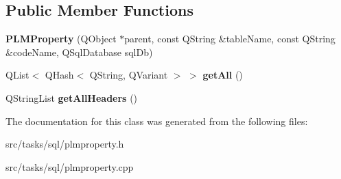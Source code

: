 \subsection*{Public Member Functions}
\begin{DoxyCompactItemize}
\item 
{\bfseries P\+L\+M\+Property} (Q\+Object $\ast$parent, const Q\+String \&table\+Name, const Q\+String \&code\+Name, Q\+Sql\+Database sql\+Db)\hypertarget{class_p_l_m_property_a6a26fedc8e762f960d07dced138c399a}{}\label{class_p_l_m_property_a6a26fedc8e762f960d07dced138c399a}

\item 
Q\+List$<$ Q\+Hash$<$ Q\+String, Q\+Variant $>$ $>$ {\bfseries get\+All} ()\hypertarget{class_p_l_m_property_a63834de001ab1da3ed626e016524cbe3}{}\label{class_p_l_m_property_a63834de001ab1da3ed626e016524cbe3}

\item 
Q\+String\+List {\bfseries get\+All\+Headers} ()\hypertarget{class_p_l_m_property_a079eaa5c5552cd589967f5bad2a0788d}{}\label{class_p_l_m_property_a079eaa5c5552cd589967f5bad2a0788d}

\end{DoxyCompactItemize}


The documentation for this class was generated from the following files\+:\begin{DoxyCompactItemize}
\item 
src/tasks/sql/plmproperty.\+h\item 
src/tasks/sql/plmproperty.\+cpp\end{DoxyCompactItemize}
